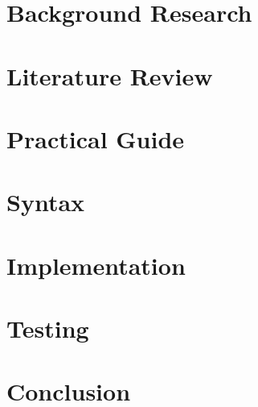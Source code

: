 \documentclass[a4paper, 12pt, oneside]{book}
\begin{document}
  \chapter{Background Research}
  
  \chapter{Literature Review}
  
  \chapter{Practical Guide}
  
  \chapter{Syntax}
  
  \chapter{Implementation}
  
  \chapter{Testing}
  
  \chapter{Conclusion}
  
  \printbibliography
\end{document}
